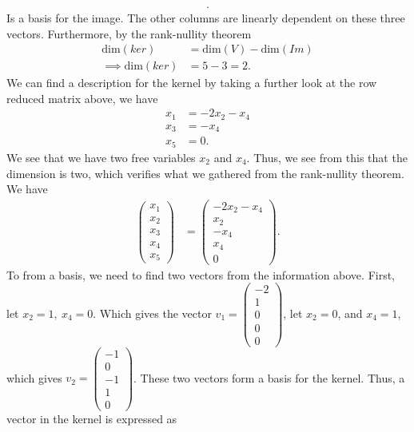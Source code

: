 \documentclass{report}
\begin{document}
\begin{itemize}
\begin{align*}
            .\end{align*}
            Is a basis for the image. The other columns are linearly dependent on these three vectors. Furthermore, by the rank-nullity theorem
            \begin{align*}
                \text{dim}(ker) &= \text{dim}(V) - \text{dim}(Im) \\
                \implies \text{dim}(ker) &= 5 - 3 = 2
            .\end{align*}
            We can find a description for the kernel by taking a further look at the row reduced matrix above, we have
            \begin{align*}
                x_{1} &= -2x_{2} - x_{4} \\
                x_{3} &= -x_{4} \\
                x_{5} &= 0
            .\end{align*}
            We see that we have two free variables $x_{2}$ and $x_{4}$. Thus, we see from this that the dimension is two, which verifies what we gathered from the rank-nullity theorem. We have
            \begin{align*}
                \begin{pmatrix} x_{1 } \\ x_{2} \\ x_{3} \\ x_{4} \\ x_{5}\end{pmatrix} &= \begin{pmatrix} -2x_{2} -x_{4} \\ x_{2} \\ -x_{4} \\ x_{4} \\ 0\end{pmatrix}
            .\end{align*}
            To from a basis, we need to find two vectors from the information above. First, let $x_{2} = 1,\ x_{4} = 0$. Which gives the vector $v_{1} = \begin{pmatrix} -2 \\ 1 \\ 0 \\ 0\\ 0 \end{pmatrix} $, let $x_{2} = 0$, and $x_{4} =1$, which gives $v_{2} = \begin{pmatrix} -1 \\ 0 \\ -1 \\ 1 \\ 0\end{pmatrix} $. These two vectors form a basis for the kernel. Thus, a vector in the kernel is expressed as

\end{itemize}
\end{document}
